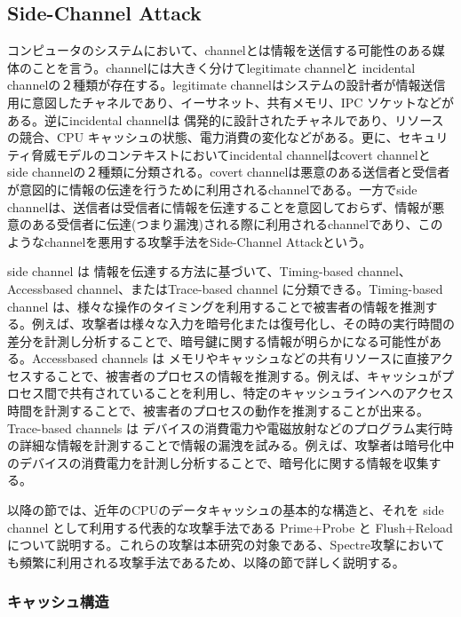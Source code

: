 \subsection{Side-Channel Attack}
コンピュータのシステムにおいて、channelとは情報を送信する可能性のある媒体のことを言う。channelには大きく分けてlegitimate channelと incidental channelの２種類が存在する\cite{intel-specter}。legitimate channelはシステムの設計者が情報送信用に意図したチャネルであり、イーサネット、共有メモリ、IPC ソケットなどがある。逆にincidental channelは 偶発的に設計されたチャネルであり、リソースの競合、CPU キャッシュの状態、電力消費の変化などがある。更に、セキュリティ脅威モデルのコンテキストにおいてincidental channelはcovert channelと side channelの２種類に分類される。covert channelは悪意のある送信者と受信者が意図的に情報の伝達を行うために利用されるchannelである。一方でside channelは、送信者は受信者に情報を伝達することを意図しておらず、情報が悪意のある受信者に伝達(つまり漏洩)される際に利用されるchannelであり、このようなchannelを悪用する攻撃手法をSide-Channel Attackという。\par 

side channel は 情報を伝達する方法に基づいて、Timing-based channel、Accessbased channel、またはTrace-based channel に分類できる\cite{szefer2019survey}。Timing-based channel は、様々な操作のタイミングを利用することで被害者の情報を推測する。例えば、攻撃者は様々な入力を暗号化または復号化し、その時の実行時間の差分を計測し分析することで、暗号鍵に関する情報が明らかになる可能性がある\cite{song2001timing}。Accessbased channels は メモリやキャッシュなどの共有リソースに直接アクセスすることで、被害者のプロセスの情報を推測する。例えば、キャッシュがプロセス間で共有されていることを利用し、特定のキャッシュラインへのアクセス時間を計測することで、被害者のプロセスの動作を推測することが出来る\cite{liu2015last}。Trace-based channels は デバイスの消費電力や電磁放射などのプログラム実行時の詳細な情報を計測することで情報の漏洩を試みる。例えば、攻撃者は暗号化中のデバイスの消費電力を計測し分析することで、暗号化に関する情報を収集する\cite{aciiccmez2006trace}。\par

以降の節では、近年のCPUのデータキャッシュの基本的な構造と、それを side channel として利用する代表的な攻撃手法である Prime+Probe\cite{tromer2010efficient} と Flush+Reload\cite{yarom2014flush+} について説明する。これらの攻撃は本研究の対象である、Spectre攻撃においても頻繁に利用される攻撃手法であるため、以降の節で詳しく説明する。

\subsubsection{キャッシュ構造}

